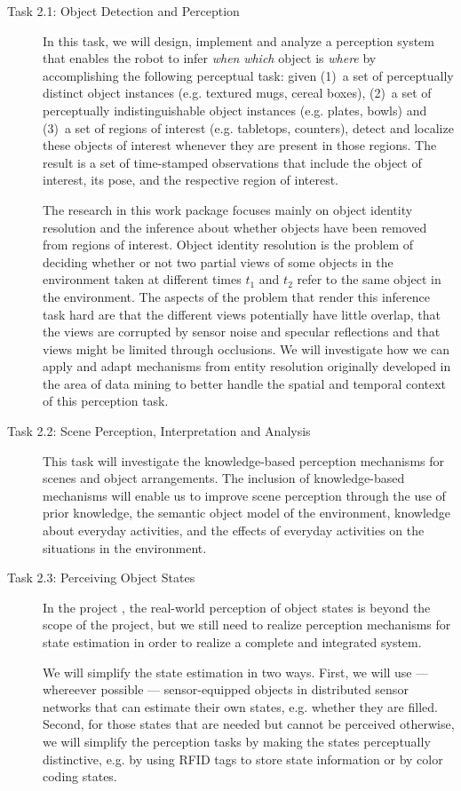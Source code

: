 \begin{description}
\item[Task 2.1: Object Detection and Perception] In this task, we will
  design, implement and analyze a perception system that enables
  the robot to infer \emph{when} \emph{which} object is \emph{where} by
  accomplishing the following perceptual task: given (1)~a set of
  perceptually distinct object instances (e.g. textured mugs, cereal boxes), 
  (2)~a set of perceptually indistinguishable object instances
  (e.g. plates, bowls) and (3)~a set of regions of interest (e.g. tabletops, counters),
  detect and localize these objects of interest whenever they are present in those regions.
  The result is a set of time-stamped observations that
  include the object of interest, its pose, and the respective region of
  interest.

  The research in this work package focuses mainly on object identity resolution 
  and the inference about whether objects have been removed from regions of interest.
  Object identity resolution is the problem of deciding whether or not two partial views
  of some objects in the environment taken at different times $t_1$ and
  $t_2$ refer to the same object in the environment. The aspects of the problem
  that render this inference task hard are that the different views potentially have
  little overlap, that the views are corrupted by sensor
  noise and specular reflections and that views might be limited
  through occlusions. We will investigate how we can apply and adapt
  mechanisms from entity resolution originally developed in the area of data
  mining to better handle the spatial and temporal context
  of this perception task.\\
\item[Task 2.2: Scene Perception, Interpretation and Analysis]
  This task will investigate the knowledge-based perception
  mechanisms for scenes and object arrangements. The inclusion of
  knowledge-based mechanisms will enable us to improve scene perception
  through the use of prior knowledge, the semantic object model of the
  environment, knowledge about everyday activities, and the effects of
  everyday activities on the situations in the environment.
\item[Task 2.3: Perceiving Object States]
  In the project \ksem, the real-world perception of object states is
  beyond the scope of the project, but we still need to realize
  perception mechanisms for state estimation in order to realize a
  complete and integrated system.

  We will simplify the state estimation in two ways. First, we will use
  --- whereever possible --- sensor-equipped objects in distributed sensor
  networks that can estimate their own states, e.g. whether they are
  filled.
  Second, for those states that are needed but cannot be perceived
  otherwise, we will simplify the perception tasks by making the states
  perceptually distinctive, e.g. by using RFID tags to store state
  information or by color coding states.
\end{description}


